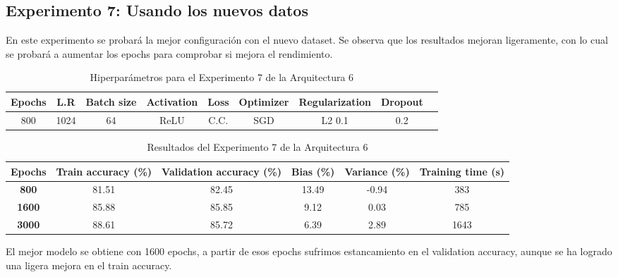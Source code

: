 \documentclass{article}
\begin{document}
    \subsection{Experimento 7: Usando los nuevos datos}

En este experimento se probar\'a la mejor configuraci\'on con el nuevo dataset. Se observa que los resultados mejoran ligeramente, con lo cual se probar\'a a aumentar los epochs para comprobar si mejora el rendimiento. 

     \begin{table}[!h]
				\begin{tabular}{|c|c|c|c|c|c|c|c|c|}
					\textbf{Epochs}&\textbf{L.R}&\textbf{Batch size}&\textbf{Activation}&\textbf{Loss}&\textbf{Optimizer}&\textbf{Regularization}&\textbf{Dropout}   \\ \hline
					800 & 1024  & 64 & ReLU & C.C. & SGD & L2 0.1 & 0.2 
				\end{tabular}
				\caption{Hiperpar\'ametros para el Experimento 7 de la Arquitectura 6}
				\label{tab:hip-a6-e2}
			\end{table}
    
   
   \begin{table}[!h]
				\begin{center}
					\begin{tabular}{ c | c | c | c | c | c |}
						 \textbf{Epochs} & \textbf{Train accuracy (\%)} & \textbf{Validation accuracy (\%)} & \textbf{Bias (\%)} & \textbf{Variance (\%)} & \textbf{Training time (s)} \\ \hline
                        \textbf{800} & 81.51   & 82.45 & 13.49 & -0.94  &   383   \\ \hline
                        \textbf{1600} & 85.88   & 85.85 & 9.12 & 0.03  &  785    \\ \hline
                        \textbf{3000} & 88.61   & 85.72  & 6.39 & 2.89  &  1643     \\ \hline
                       
					\end{tabular}
					\caption{Resultados del Experimento 7 de la Arquitectura 6}
					\label{tab:res-a2-e5}
				\end{center}
			\end{table}

   El mejor modelo se obtiene con 1600 epochs, a partir de esos epochs sufrimos estancamiento en el validation accuracy, aunque se ha logrado una ligera mejora en el train accuracy. 
\end{document}
